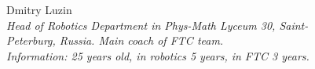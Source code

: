 \begin{figure}[H]
	
	\begin{minipage}[h]{0.47\linewidth}
		Dmitry Luzin \\
		\emph{Head of Robotics Department in Phys-Math Lyceum 30, Saint-Peterburg, Russia. Main coach of FTC team.\\}
		\emph{Information: 25 years old, in robotics 5 years, in FTC 3 years.}
	\end{minipage}
	\hfill
	\begin{minipage}{0.47\linewidth}
		\\
	\end{minipage}
	\vfill
	\begin{minipage}[h]{0.47\linewidth}

\end{minipage}
\end{figure}
